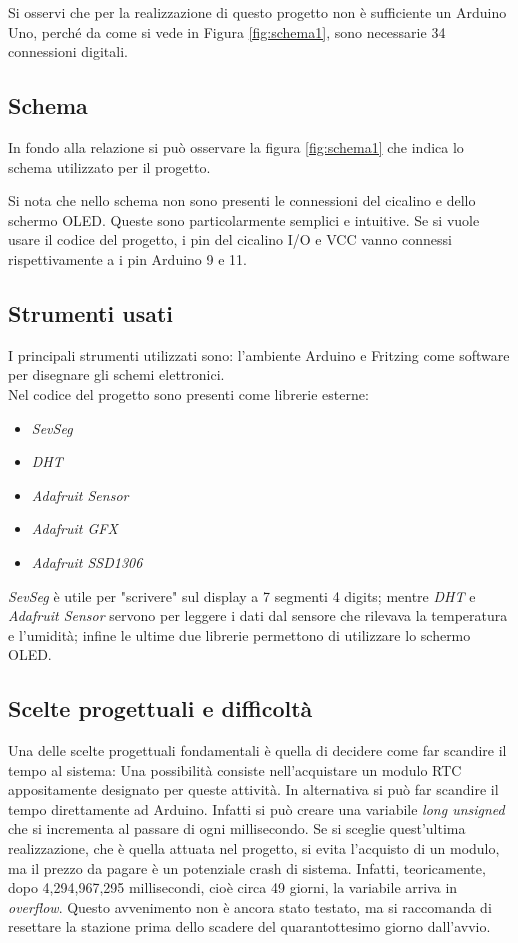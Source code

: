 \documentclass[paper=a4, fontsize=10pt]{scrartcl}
\begin{document}
Si osservi che per la realizzazione di questo progetto non è sufficiente un Arduino Uno, perché da come si vede in Figura \ref{fig:schema1}, sono necessarie 34 connessioni digitali.
\subsection{Schema}
In fondo alla relazione si può osservare la figura \ref{fig:schema1} che indica lo schema utilizzato per il progetto.

Si nota che nello schema non sono presenti le connessioni del cicalino e dello schermo OLED. Queste sono particolarmente semplici e intuitive. Se si vuole usare il codice del progetto, i pin del cicalino I/O e VCC vanno connessi rispettivamente a i pin Arduino 9 e 11.

\pagebreak

\subsection{Strumenti usati}
I principali strumenti utilizzati sono: l'ambiente Arduino e Fritzing come software per disegnare gli schemi elettronici.\\
Nel codice del progetto sono presenti come librerie esterne:
\begin{itemize}
\item \textit{SevSeg}
\item \textit{DHT}
\item \textit{Adafruit Sensor}
\item \textit{Adafruit GFX}
\item \textit{Adafruit SSD1306}
\end{itemize}

\textit{SevSeg} è utile per "scrivere" sul display a 7 segmenti 4 digits; mentre \textit{DHT} e \textit{Adafruit Sensor} servono per leggere i dati dal sensore che rilevava la temperatura e l'umidità; infine  le ultime due librerie permettono di utilizzare lo schermo OLED. 


\subsection{Scelte progettuali e difficoltà}
Una delle scelte progettuali fondamentali è quella di decidere come far scandire il tempo al sistema:
Una possibilità consiste nell'acquistare un modulo RTC appositamente designato per queste attività. In alternativa si può far scandire il tempo direttamente ad Arduino. Infatti si può creare una variabile \textit{long unsigned} che si incrementa al passare di ogni millisecondo. Se si sceglie quest'ultima realizzazione, che è quella attuata nel progetto, si evita l'acquisto di un modulo, ma il prezzo da pagare è un potenziale crash di sistema. Infatti, teoricamente, dopo 4,294,967,295 millisecondi, cioè circa 49 giorni, la variabile arriva in \textit{overflow}. Questo avvenimento non è ancora stato testato, ma si raccomanda di resettare la stazione prima dello scadere del quarantottesimo giorno dall'avvio.
\end{document}
